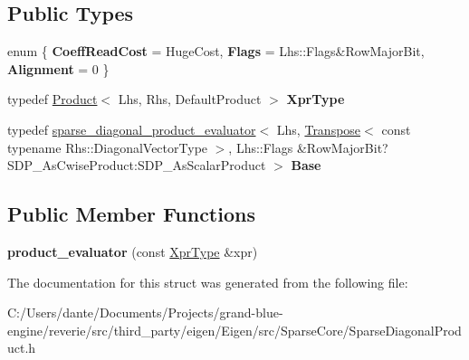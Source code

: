 \subsection*{Public Types}
\begin{DoxyCompactItemize}
\item 
\mbox{\label{struct_eigen_1_1internal_1_1product__evaluator_3_01_product_3_01_lhs_00_01_rhs_00_01_default_prod80b2bd6031901e266d576d7eb3e9735_a037b88e2bacd3913c25b86ffd55b7ae9}} 
enum \{ {\bfseries Coeff\+Read\+Cost} = Huge\+Cost, 
{\bfseries Flags} = Lhs\+::Flags\&Row\+Major\+Bit, 
{\bfseries Alignment} = 0
 \}
\item 
\mbox{\label{struct_eigen_1_1internal_1_1product__evaluator_3_01_product_3_01_lhs_00_01_rhs_00_01_default_prod80b2bd6031901e266d576d7eb3e9735_ad7e213d02284c4be1559b4cb57c3f09f}} 
typedef \mbox{\hyperlink{class_eigen_1_1_product}{Product}}$<$ Lhs, Rhs, Default\+Product $>$ {\bfseries Xpr\+Type}
\item 
\mbox{\label{struct_eigen_1_1internal_1_1product__evaluator_3_01_product_3_01_lhs_00_01_rhs_00_01_default_prod80b2bd6031901e266d576d7eb3e9735_a84c722c9b32fedd4493e912c63a42f8e}} 
typedef \mbox{\hyperlink{struct_eigen_1_1internal_1_1sparse__diagonal__product__evaluator}{sparse\+\_\+diagonal\+\_\+product\+\_\+evaluator}}$<$ Lhs, \mbox{\hyperlink{class_eigen_1_1_transpose}{Transpose}}$<$ const typename Rhs\+::\+Diagonal\+Vector\+Type $>$, Lhs\+::\+Flags \&Row\+Major\+Bit?S\+D\+P\+\_\+\+As\+Cwise\+Product\+:\+S\+D\+P\+\_\+\+As\+Scalar\+Product $>$ {\bfseries Base}
\end{DoxyCompactItemize}
\subsection*{Public Member Functions}
\begin{DoxyCompactItemize}
\item 
\mbox{\label{struct_eigen_1_1internal_1_1product__evaluator_3_01_product_3_01_lhs_00_01_rhs_00_01_default_prod80b2bd6031901e266d576d7eb3e9735_a6aa8293ada730b9989cbaf13083d3fdc}} 
{\bfseries product\+\_\+evaluator} (const \mbox{\hyperlink{class_eigen_1_1_product}{Xpr\+Type}} \&xpr)
\end{DoxyCompactItemize}


The documentation for this struct was generated from the following file\+:\begin{DoxyCompactItemize}
\item 
C\+:/\+Users/dante/\+Documents/\+Projects/grand-\/blue-\/engine/reverie/src/third\+\_\+party/eigen/\+Eigen/src/\+Sparse\+Core/Sparse\+Diagonal\+Product.\+h\end{DoxyCompactItemize}
